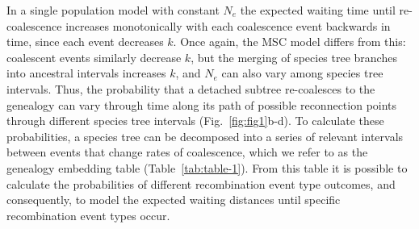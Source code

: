 \documentclass[11pt]{article}
\begin{document}
In a single population model with constant $N_e$ the expected waiting time until 
re-coalescence increases monotonically with each coalescence event 
backwards in time, since each event decreases $k$.
Once again, the MSC model differs from this: 
coalescent events similarly decrease $k$, but the merging of 
species tree branches into ancestral intervals increases $k$, and $N_e$ 
can also vary among species tree intervals. 
Thus, the probability that a detached subtree re-coalesces to the genealogy 
can vary through time along its path of possible reconnection points through 
different species tree intervals
(Fig.~\ref{fig:fig1}b-d).
To calculate these probabilities, a species tree can be decomposed into a 
series of relevant intervals between events that change rates of coalescence,
which we refer to as the genealogy embedding table (Table~\ref{tab:table-1}). 
From this table it is possible to calculate the probabilities of different
recombination event type outcomes, and consequently, to model the expected 
waiting distances until specific recombination event types occur. 

\end{document}
